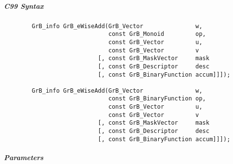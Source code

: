\subparagraph{C99 Syntax}

\begin{verbatim}
        GrB_info GrB_eWiseAdd(GrB_Vector               w,
                              const GrB_Monoid         op, 
                              const GrB_Vector         u,
                              const GrB_Vector         v
                           [, const GrB_MaskVector     mask
                           [, const GrB_Descriptor     desc
                           [, const GrB_BinaryFunction accum]]]);
                            
        GrB_info GrB_eWiseAdd(GrB_Vector               w,
                              const GrB_BinaryFunction op, 
                              const GrB_Vector         u,
                              const GrB_Vector         v
                           [, const GrB_MaskVector     mask
                           [, const GrB_Descriptor     desc
                           [, const GrB_BinaryFunction accum]]]);
\end{verbatim}

\subparagraph{Parameters}

